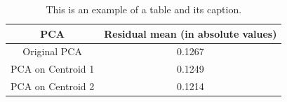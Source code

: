 \begin{table}[!ht]
\renewcommand{\arraystretch}{1.50}
\caption{This is an example of a table and its caption.}
\label{tablePCA}
\centering
\begin{tabular}{| c | c |}
\hline
\bfseries PCA & \bfseries Residual mean (in absolute values) \\
\hline\hline
Original PCA & 0.1267  \\
\hline
PCA on Centroid 1 & 0.1249\\
\hline
PCA on Centroid 2 & 0.1214  \\
\hline
\end{tabular}
\end{table}

\newpage


